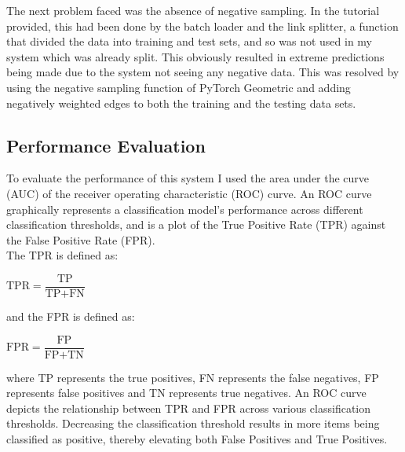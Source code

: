 \documentclass{l4proj}
\begin{document}
The next problem faced was the absence of negative sampling. In the tutorial provided, this had been done by the batch loader and the link splitter, a function that divided the data into training and test sets, and so was not used in my system which was already split. This obviously resulted in extreme predictions being made due to the system not seeing any negative data. This was resolved by using the negative sampling function of PyTorch Geometric and adding negatively weighted edges to both the training and the testing data sets. \\

\subsection{Performance Evaluation}

To evaluate the performance of this system I used the area under the curve (AUC) of the receiver operating characteristic (ROC) curve. An ROC curve graphically represents a classification model's performance across different classification thresholds, and is a plot of the True Positive Rate (TPR) against the False Positive Rate (FPR). \\

The TPR is defined as: 

\begin{center}
    $\text{TPR} = \dfrac{\text{TP}}{\text{TP} + \text{FN}}$ \\
\end{center}

\vspace{10mm} 
and the FPR is defined as: 

\begin{center}
    $\text{FPR} = \dfrac{\text{FP}}{\text{FP} + \text{TN}}$
\end{center}

where TP represents the true positives, FN represents the false negatives, FP represents false positives and TN represents true negatives. An ROC curve depicts the relationship between TPR and FPR across various classification thresholds. Decreasing the classification threshold results in more items being classified as positive, thereby elevating both False Positives and True Positives. \\ 
\end{document}

